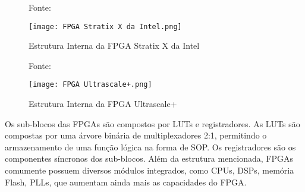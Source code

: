 \begin{figure}[h!]
    \centering
    \captionsetup{justification=centering}
    \caption*{Fonte: \cite{Pedroni2010}}
    \texttt{[image: FPGA Stratix X da Intel.png]}
    \caption{Estrutura Interna da FPGA Stratix X da Intel}
    \label{fig:Stratix}
\end{figure}

\begin{figure}[h!]
    \centering
    \captionsetup{justification=centering}
    \caption*{Fonte: \cite{Pedroni2010}}
    \texttt{[image: FPGA Ultrascale+.png]}
    \caption{Estrutura Interna da FPGA Ultrascale+}
    \label{fig:Ultrascale}
\end{figure}

Os sub-blocos das FPGAs são compostos por LUTs e registradores. As LUTs são compostas por uma árvore binária de multiplexadores 2:1, permitindo o armazenamento de uma função lógica na forma de SOP. Os registradores são os componentes síncronos dos sub-blocos. Além da estrutura mencionada, FPGAs comumente possuem diversos módulos integrados, como CPUs, DSPs, memória Flash, PLLs, que aumentam ainda mais as capacidades do FPGA.





